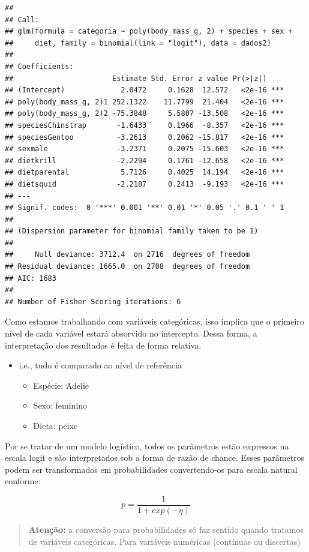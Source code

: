 \documentclass[
]{book}
\providecommand{\tightlist}{%
  \setlength{\itemsep}{0pt}\setlength{\parskip}{0pt}}
\begin{document}
\begin{verbatim}
## 
## Call:
## glm(formula = categoria ~ poly(body_mass_g, 2) + species + sex + 
##     diet, family = binomial(link = "logit"), data = dados2)
## 
## Coefficients:
##                       Estimate Std. Error z value Pr(>|z|)    
## (Intercept)             2.0472     0.1628  12.572   <2e-16 ***
## poly(body_mass_g, 2)1 252.1322    11.7799  21.404   <2e-16 ***
## poly(body_mass_g, 2)2 -75.3848     5.5807 -13.508   <2e-16 ***
## speciesChinstrap       -1.6433     0.1966  -8.357   <2e-16 ***
## speciesGentoo          -3.2613     0.2062 -15.817   <2e-16 ***
## sexmale                -3.2371     0.2075 -15.603   <2e-16 ***
## dietkrill              -2.2294     0.1761 -12.658   <2e-16 ***
## dietparental            5.7126     0.4025  14.194   <2e-16 ***
## dietsquid              -2.2187     0.2413  -9.193   <2e-16 ***
## ---
## Signif. codes:  0 '***' 0.001 '**' 0.01 '*' 0.05 '.' 0.1 ' ' 1
## 
## (Dispersion parameter for binomial family taken to be 1)
## 
##     Null deviance: 3712.4  on 2716  degrees of freedom
## Residual deviance: 1665.0  on 2708  degrees of freedom
## AIC: 1683
## 
## Number of Fisher Scoring iterations: 6
\end{verbatim}

Como estamos trabalhando com variáveis categóricas, isso implica que o primeiro nível de cada variável estará absorvido no intercepto. Dessa forma, a interpretação dos resultados é feita de forma relativa.

\begin{itemize}
\tightlist
\item
  i.e., tudo é comparado ao nível de referência

  \begin{itemize}
  \tightlist
  \item
    Espécie: Adelie
  \item
    Sexo: feminino
  \item
    Dieta: peixe
  \end{itemize}
\end{itemize}

Por se tratar de um modelo logístico, todos os parâmetros estão expressos na escala logit e são interpretados sob a forma de razão de chance. Esses parâmetros podem ser transformados em probabilidades convertendo-os para escala natural conforme:

\[p = \frac{1}{1 + exp(-\eta)}\]

\begin{quote}
\textbf{Atenção:} a conversão para probabilidades só faz sentido quando tratamos de variáveis categóricas. Para variáveis numéricas (contínuas ou discertas)
\end{quote}
\end{document}

